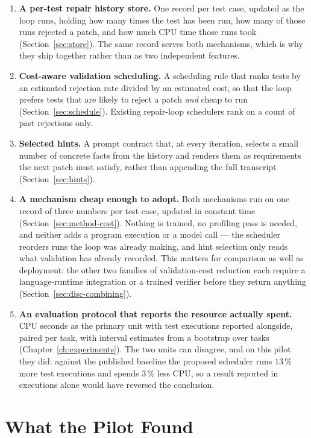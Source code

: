 \begin{enumerate}[leftmargin=*,itemsep=4pt]
\item \textbf{A per-test repair history store.} One record per test case,
updated as the loop runs, holding how many times the test has been run, how many
of those runs rejected a patch, and how much CPU time those runs took
(Section~\ref{sec:store}). The same record serves both mechanisms, which is why
they ship together rather than as two independent features.
\item \textbf{Cost-aware validation scheduling.} A scheduling rule that ranks
tests by an estimated rejection rate divided by an estimated cost, so that the
loop prefers tests that are likely to reject a patch \emph{and} cheap to run
(Section~\ref{sec:schedule}). Existing repair-loop schedulers rank on a count of
past rejections only.
\item \textbf{Selected hints.} A prompt contract that, at every iteration,
selects a small number of concrete facts from the history and renders them as
requirements the next patch must satisfy, rather than appending the full
transcript (Section~\ref{sec:hints}).
\item \textbf{A mechanism cheap enough to adopt.} Both mechanisms run on one
record of three numbers per test case, updated in constant time
(Section~\ref{sec:method-cost}). Nothing is trained, no profiling pass is
needed, and neither adds a program execution or a model call --- the scheduler
reorders runs the loop was already making, and hint selection only reads what
validation has already recorded. This matters for comparison as well as
deployment: the other two families of validation-cost reduction each require a
language-runtime integration or a trained verifier before they return anything
(Section~\ref{sec:disc-combining}).

\item \textbf{An evaluation protocol that reports the resource actually spent.}
CPU seconds as the primary unit with test executions reported alongside, paired
per task, with interval estimates from a bootstrap over tasks
(Chapter~\ref{ch:experiments}). The two units can disagree, and on this pilot
they did: against the published baseline the proposed scheduler runs $13\,\%$
more test executions and spends $3\,\%$ less CPU, so a result reported in
executions alone would have reversed the conclusion.
\end{enumerate}

\section{What the Pilot Found}
\label{sec:intro-findings}

